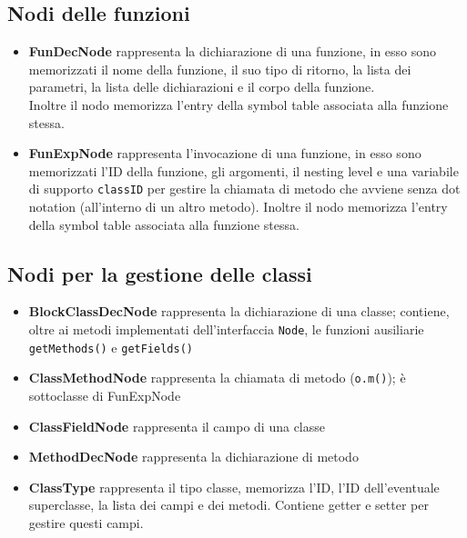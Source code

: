 \documentclass[a4paper]{article}   %
\begin{document}


\subsection{Nodi delle funzioni}
\begin{itemize}
  \item \textbf{FunDecNode} rappresenta la dichiarazione di una funzione, in esso sono memorizzati
  il nome della funzione, il suo tipo di ritorno, la lista dei parametri, la lista delle dichiarazioni e il corpo della funzione.\\
  Inoltre il nodo memorizza l'entry della symbol table associata alla funzione stessa.
  \item \textbf{FunExpNode} rappresenta l'invocazione di una funzione, in esso sono memorizzati l'ID della funzione, gli argomenti, il nesting level e una variabile di supporto \lstinline|classID| per gestire la chiamata di metodo che avviene senza dot notation (all'interno di un altro metodo). Inoltre il nodo memorizza l'entry della symbol table associata alla funzione stessa.
\end{itemize}
\subsection{Nodi per la gestione delle classi}
\begin{itemize}
  \item \textbf{BlockClassDecNode} rappresenta la dichiarazione di una classe; contiene, oltre ai metodi implementati dell'interfaccia \lstinline|Node|, le funzioni ausiliarie \lstinline|getMethods()| e \lstinline|getFields()|
  \item \textbf{ClassMethodNode} rappresenta la chiamata di metodo (\lstinline|o.m()|); è sottoclasse di FunExpNode
  \item \textbf{ClassFieldNode} rappresenta il campo di una classe
  \item \textbf{MethodDecNode} rappresenta la dichiarazione di metodo
  \item \textbf{ClassType} rappresenta il tipo classe, memorizza l'ID, l'ID dell'eventuale superclasse, la lista dei campi e dei metodi. Contiene getter e setter per gestire questi campi.
\end{itemize}
\end{document}
